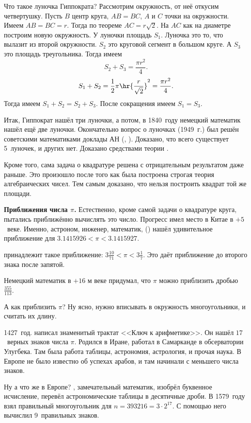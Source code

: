 \documentclass[a4paper,oneside,fleqn,10pt]{article}
\begin{document}
Что такое луночка Гиппократа? Рассмотрим окружность, от неё откусим четвертушку.
Пусть $B$ центр круга, $AB= BC$, $A$ и $C$ точки на окружности.
Имеем $AB = BC = r$. Тогда по теореме  $AC = r\sqrt2$.
На $AC$ как на диаметре построим новую окружность. У луночки площадь $S_1$.
Луночка это то, что вылазит из второй окружности. $S_2$ это круговой сегмент
в большом круге. А $S_3$ это площадь треугольника. Тогда имеем
$$S_2 + S_3 = \frac{\pi r^2}{4}.$$
$$S_1 + S_2 = \frac12 \pi \hr{\frac{r}{\sqrt2}}^2 = \frac{\pi r^2}{4}.$$
Тогда имеем $S_1 + S_2 = S_2 + S_3$. После сокращения имеем
$S_1 = S_3$.

Итак, Гиппократ нашёл три луночки, а потом, в 1840~году
немецкий математик  нашёл ещё две луночки.
Окончательно вопрос о луночках (1949~г.) был решён советскими
математиками доклады АН (, ).
Доказано, что всего существует 5~луночек, и других нет.
Доказано средствами теории .

Кроме того, сама задача о квадратуре решена с отрицательным результатом даже раньше.
Это произошло после того как была построена строгая теория алгебраических чисел. Тем самым доказано, что нельзя
построить квадрат той же площади.

\textbf{Приближения числа $\pi$.}
Естественно, кроме самой задачи о квадратуре круга, пытались приближённо вычислять
это число. Прогресс имел место в Китае в $+5$~веке. Именно, астроном, инженер, математик,
 ()
нашёл удивительное приближение для $3.1415926 < \pi < 3.1415927$.

 принадлежит такое приближение:
$3\frac{10}{71} < \pi < 3 \frac{1}{7}$.
Это даёт приближение до второго знака после запятой.

Немецкий математик  в $+16$ м веке придумал, что
$\pi$ можно приблизить дробью $\frac{355}{113}$.

А как приблизить $\pi$? Ну ясно, нужно вписывать в окружность многоугольники, и считать их длину.

1427~год.  написал  знаменитый трактат <<Ключ к арифметике>>. Он нашёл $17$~верных знаков числа $\pi$.
Родился в Иране, работал в Самарканде в обсерватории Улугбека. Там была работа таблицы,
астрономия, астрология, и прочая наука. В Европе не было известно об успехах арабов, и там начинали с
меньшего числа знаков.

Ну а что же в Европе? , замечательный математик, изобрёл буквенное исчисление,
перевёл  астрономические таблицы в десятичные дроби. В 1579~году взял правильный
многоугольник для $n = 393216 = 3\cdot 2^{17}$.
С помощью него вычислил 9~правильных знаков.
\end{document}

